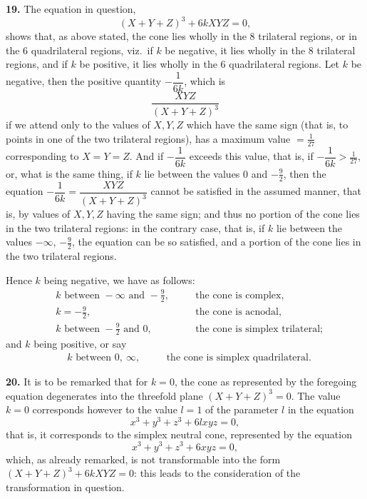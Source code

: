 \documentclass[11pt,a4paper]{article}
\begin{document}
\textbf{19.} The equation in question,
\[
(X + Y + Z)^{3} + 6kXYZ = 0,
\]
shows that, as above stated, the cone lies wholly in the 8 trilateral regions, or in the 6 quadrilateral regions, viz.\ if $k$ be negative, it lies wholly in the 8 trilateral regions, and if $k$ be positive, it lies wholly in the 6 quadrilateral regions. Let $k$ be negative, then the positive quantity $-\dfrac{1}{6k}$, which is
\[
\frac{XYZ}{(X + Y + Z)^{3}}
\]
if we attend only to the values of $X, Y, Z$ which have the same sign (that is, to points in one of the two trilateral regions), has a maximum value $= \tfrac{1}{27}$ corresponding to $X = Y = Z$. And if $-\dfrac{1}{6k}$ exceeds this value, that is, if $-\dfrac{1}{6k} > \tfrac{1}{27}$, or, what is the same thing, if $k$ lie between the values $0$ and $-\tfrac{9}{2}$, then the equation $-\dfrac{1}{6k} = \dfrac{XYZ}{(X + Y + Z)^{3}}$ cannot be satisfied in the assumed manner, that is, by values of $X, Y, Z$ having the same sign; and thus no portion of the cone lies in the two trilateral regions: in the contrary case, that is, if $k$ lie between the values $-\infty$, $-\tfrac{9}{2}$, the equation can be so satisfied, and a portion of the cone lies in the two trilateral regions.

Hence $k$ being negative, we have as follows:
\begin{align*}
&k \text{ between } -\infty \text{ and } -\tfrac{9}{2},\quad &&\text{the cone is complex,}\\
&k = -\tfrac{9}{2},\quad &&\text{the cone is acnodal,}\\
&k \text{ between } -\tfrac{9}{2} \text{ and } 0,\quad &&\text{the cone is simplex trilateral;}
\end{align*}
and $k$ being positive, or say
\begin{align*}
&k \text{ between } 0,\ \infty,\quad &&\text{the cone is simplex quadrilateral.}
\end{align*}

\textbf{20.} It is to be remarked that for $k = 0$, the cone as represented by the foregoing equation degenerates into the threefold plane $(X + Y + Z)^{3} = 0$. The value $k = 0$ corresponds however to the value $l = 1$ of the parameter $l$ in the equation
\[
x^{3} + y^{3} + z^{3} + 6lxyz = 0,
\]
that is, it corresponds to the simplex neutral cone, represented by the equation
\[
x^{3} + y^{3} + z^{3} + 6xyz = 0,
\]
which, as already remarked, is not transformable into the form $(X + Y + Z)^{3} + 6kXYZ = 0$: this leads to the consideration of the transformation in question.
\end{document}
